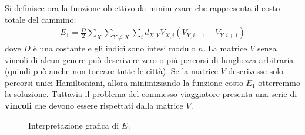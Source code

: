Si definisce ora la funzione obiettivo da minimizzare che rappresenta il costo totale del cammino:
\begin{align*}
    E_1  = \frac{D}{2} \sum_X \sum_{Y \neq X} \sum_i d_{X,Y} V_{X,i} (V_{Y, i-1} + V_{Y, i+1})
\end{align*}
dove $D$ è una costante e gli indici sono intesi modulo $n$. La matrice $V$ senza vincoli di alcun genere può descrivere zero o più percorsi di lunghezza arbitraria (quindi può anche non toccare tutte le città).
Se la matrice $V$ descrivesse solo percorsi unici Hamiltoniani, allora minimizzando la funzione costo $E_1$ otterremmo la soluzione. Tuttavia il problema del commesso viaggiatore presenta una serie di \textbf{vincoli} che devono essere rispettati dalla matrice $V$.

\newpage


\begin{figure}[h!]
    \centering
    
    \qquad
    \caption{Interpretazione grafica di $E_1$}
\end{figure}


